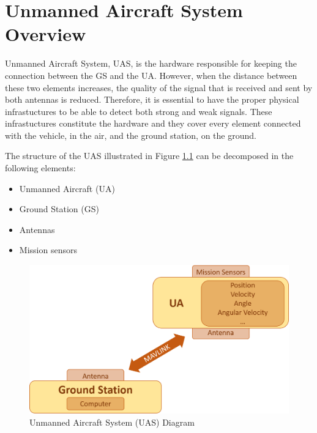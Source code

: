 \chapter{Unmanned Aircraft System Overview}\label{ch:uas}

Unmanned Aircraft System, UAS, is the hardware responsible for keeping the connection between the GS and the UA. However, when the distance between these two elements increases, the quality of the signal that is received and sent by both antennas is reduced. Therefore, it is essential to have the proper physical infrastuctures to be able to detect both strong and weak signals. These infrastuctures constitute the hardware and they cover every element connected with the vehicle, in the air, and the ground station, on the ground.


The structure of the UAS illustrated in Figure \ref{fig:uas} can be decomposed in the following elements:
\begin{itemize}
	\item Unmanned Aircraft (UA)
	\item Ground Station (GS)
	\item Antennas
	\item Mission sensors
\end{itemize}

\begin{figure}[H]
	\centering
	\includegraphics[scale=0.4]{figures/uas.png}
	\caption{Unmanned Aircraft System (UAS) Diagram}
	\label{fig:uas}
\end{figure}

